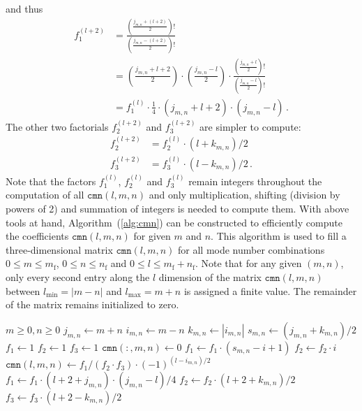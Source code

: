 and thus
\begin{align}
 f_1^{(l+2)} &= \frac{\left( \frac{j_{m,n}+(l+2)}{2} \right)!}
                     {\left( \frac{j_{m,n}-(l+2)}{2} \right)!} \nonumber \\
    ~        &= \left(\frac{j_{m,n}+l+2}{2} \right) \cdot \left( \frac{j_{m,n}-l  }{2} \right) \cdot
                \frac{\left( \frac{j_{m,n}+l}{2} \right)!}
                     {\left( \frac{j_{m,n}-l}{2} \right)!} \nonumber \\
    ~        &= f_1^{(l)} \cdot \frac{1}{4} \cdot (j_{m,n}+l+2) \cdot (j_{m,n}-l) \, .
\end{align}
The other two factorials $f_2^{(l+2)}$ and $f_3^{(l+2)}$ are simpler to compute:
\begin{align}
 f_2^{(l+2)} &= f_2^{(l)} \cdot (l+k_{m,n})/2 \\
 f_3^{(l+2)} &= f_3^{(l)} \cdot (l-k_{m,n})/2 \, .
\end{align}
Note that the factors $f_1^{(l)}$, $f_2^{(l)}$ and $f_3^{(l)}$ remain integers throughout the computation of all $\mathtt{cmn}(l,m,n)$
and only multiplication, shifting (division by powers of 2) and summation of integers is needed to compute them.
With above tools at hand, Algorithm~(\ref{alg:cmn}) can be constructed to efficiently compute the coefficients $\mathtt{cmn}(l,m,n)$
for given $m$ and $n$.
This algorithm is used to fill a three-dimensional matrix $\mathtt{cmn}(l,m,n)$ for all mode number combinations
$0 \leq m \leq m_\mathrm{f}$, $0 \leq n \leq n_\mathrm{f}$ and $0 \leq l \leq m_\mathrm{f}+n_\mathrm{f}$.
Note that for any given $(m,n)$, only every second entry along the $l$ dimension of the matrix $\mathtt{cmn}(l,m,n)$
between $l_\mathrm{min}=|m-n|$ and $l_\mathrm{max}=m+n$ is assigned a finite value. The remainder of the matrix remains initialized to zero.
\begin{algorithm}
\caption{Calculate $\mathtt{cmn}(l,m,n)$}
\begin{algorithmic}
\Require $m \geq 0, n \geq 0$
\State $j_{m,n} \gets m + n$
\State $i_{m,n} \gets m - n$
\State $k_{m,n} \gets |i_{m,n}|$
\State $s_{m,n} \gets (j_{m,n} + k_{m,n})/2$
\State $f_1 \gets 1$
\State $f_2 \gets 1$
\State $f_3 \gets 1$
\State $\mathtt{cmn}(:,m,n) \gets 0$
  \State $f_1 \gets f_1 \cdot (s_{m,n} - i + 1)$
  \State $f_2 \gets f_2 \cdot i$
\EndFor
{}
  \State $\mathtt{cmn}(l,m,n) \gets f_1/(f_2 \cdot f_3) \cdot (-1)^{(l-i_{m,n})/2}$
  \State $f_1 \gets f_1 \cdot (l+2+j_{m,n}) \cdot (j_{m,n}-l) / 4$
  \State $f_2 \gets f_2 \cdot (l+2+k_{m,n})/2$
  \State $f_3 \gets f_3 \cdot (l+2-k_{m,n})/2$
\EndFor
\end{algorithmic}
\label{alg:cmn}
\end{algorithm}
